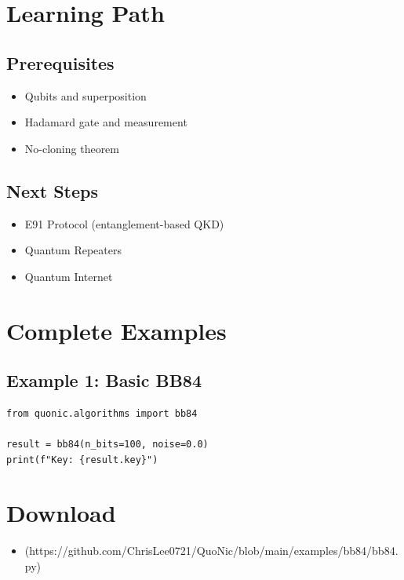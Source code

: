 \documentclass[12pt,a4paper]{article}
\begin{document}
\section{Learning Path}

\subsection{Prerequisites}
\begin{itemize}
  \item Qubits and superposition
  \item Hadamard gate and measurement
  \item No-cloning theorem
\end{itemize}

\subsection{Next Steps}
\begin{itemize}
  \item E91 Protocol (entanglement-based QKD)
  \item Quantum Repeaters
  \item Quantum Internet
\end{itemize}

\section{Complete Examples}

\subsection{Example 1: Basic BB84}

\begin{verbatim}
from quonic.algorithms import bb84

result = bb84(n_bits=100, noise=0.0)
print(f"Key: {result.key}")
\end{verbatim}

\section{Download}

\begin{itemize}
  \item [bb84.py](https://github.com/ChrisLee0721/QuoNic/blob/main/examples/bb84/bb84.py)
\end{itemize}
\end{document}
